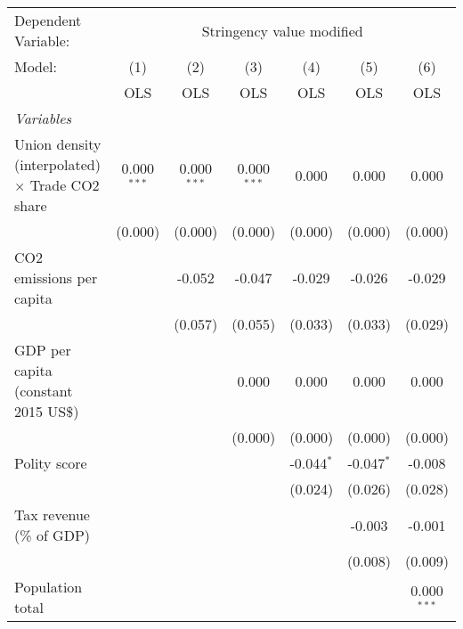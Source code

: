 
\begingroup
\centering
\begin{tabular}{lcccccc}
   \toprule
   Dependent Variable: & \multicolumn{6}{c}{Stringency value modified}\\
   Model:                                                 & (1)           & (2)           & (3)           & (4)          & (5)          & (6)\\  
                                                          &  OLS          & OLS           & OLS           & OLS          & OLS          & OLS\\  
   \midrule
   \emph{Variables}\\
   Union density (interpolated) $\times$ Trade CO2 share  & 0.000$^{***}$ & 0.000$^{***}$ & 0.000$^{***}$ & 0.000        & 0.000        & 0.000\\   
                                                          & (0.000)       & (0.000)       & (0.000)       & (0.000)      & (0.000)      & (0.000)\\   
   CO2 emissions per capita                               &               & -0.052        & -0.047        & -0.029       & -0.026       & -0.029\\   
                                                          &               & (0.057)       & (0.055)       & (0.033)      & (0.033)      & (0.029)\\   
   GDP per capita (constant 2015 US\$)                    &               &               & 0.000         & 0.000        & 0.000        & 0.000\\   
                                                          &               &               & (0.000)       & (0.000)      & (0.000)      & (0.000)\\   
   Polity score                                           &               &               &               & -0.044$^{*}$ & -0.047$^{*}$ & -0.008\\   
                                                          &               &               &               & (0.024)      & (0.026)      & (0.028)\\   
   Tax revenue (\% of GDP)                                &               &               &               &              & -0.003       & -0.001\\   
                                                          &               &               &               &              & (0.008)      & (0.009)\\   
   Population total                                       &               &               &               &              &              & 0.000$^{***}$\\   

\end{tabular}
